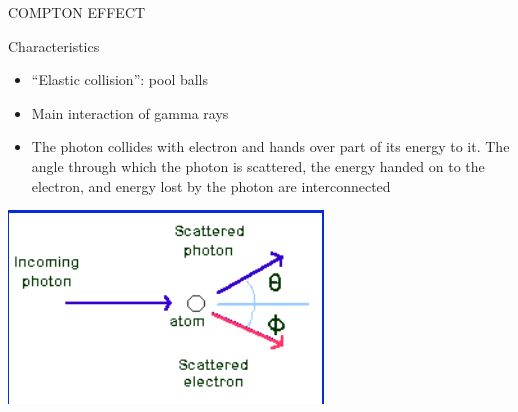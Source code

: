 \begin{frame}{COMPTON EFFECT}

\vskip0.3cm
\begin{exampleblock}{Characteristics}

\begin{itemize}
\item ``Elastic collision'': pool balls 
\item Main interaction of gamma rays 
\item The photon collides with electron and hands over part of its energy to it. The angle through which the photon is scattered, the energy handed on to the electron, and energy lost by the photon are interconnected
\end{itemize}

\end{exampleblock}


\centering
\includegraphics[scale=0.4]{figures/comptoneffect.png}

\end{frame}


